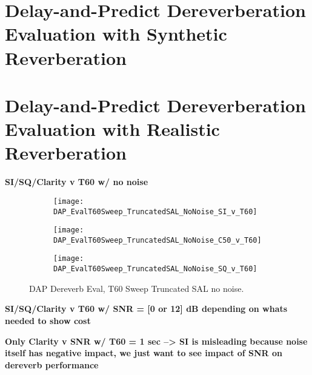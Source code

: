 \section{Delay-and-Predict Dereverberation Evaluation with Synthetic Reverberation}

\section{Delay-and-Predict Dereverberation Evaluation with Realistic Reverberation}

\textbf{SI/SQ/Clarity v T60 w/ no noise}

\begin{figure}[H]
	\centering
	\begin{subfigure}[b]{0.98\textwidth}
		\centering
		\texttt{[image: DAP\_EvalT60Sweep\_TruncatedSAL\_NoNoise\_SI\_v\_T60]}
	\end{subfigure}
		\begin{subfigure}[b]{0.5\textwidth}
		\centering
		\texttt{[image: DAP\_EvalT60Sweep\_TruncatedSAL\_NoNoise\_C50\_v\_T60]}
	\end{subfigure}
		\begin{subfigure}[b]{0.98\textwidth}
		\centering
		\texttt{[image: DAP\_EvalT60Sweep\_TruncatedSAL\_NoNoise\_SQ\_v\_T60]}
	\end{subfigure}
	\caption{DAP Dereverb Eval, T60 Sweep Truncated SAL no noise.}
	\label{fig:DAP_EvalT60Sweep_TruncatedSAL_NoNoise}
\end{figure}


\textbf{SI/SQ/Clarity v T60 w/ SNR = [0 or 12] dB depending on whats needed to show cost}


\textbf{Only Clarity v SNR w/ T60 = 1 sec --> SI is misleading because noise itself has negative impact, we just want to see impact of SNR on dereverb performance}




